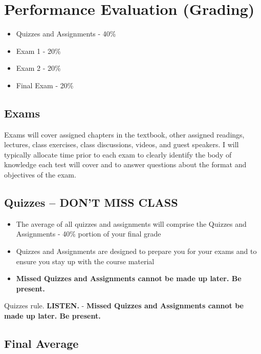\documentclass[
]{book}
\providecommand{\tightlist}{%
  \setlength{\itemsep}{0pt}\setlength{\parskip}{0pt}}
\begin{document}
\hypertarget{performance-evaluation-grading}{%
\section{Performance Evaluation (Grading)}\label{performance-evaluation-grading}}

\begin{itemize}
\tightlist
\item
  Quizzes and Assignments - 40\%
\item
  Exam 1 - 20\%
\item
  Exam 2 - 20\%
\item
  Final Exam - 20\%
\end{itemize}

\hypertarget{exams}{%
\subsection{Exams}\label{exams}}

Exams will cover assigned chapters in the textbook, other assigned readings, lectures, class exercises, class discussions, videos, and guest speakers. I will typically allocate time prior to each exam to clearly identify the body of knowledge each test will cover and to answer questions about the format and objectives of the exam.

\hypertarget{quizzes-dont-miss-class}{%
\subsection{\texorpdfstring{Quizzes -- \textbf{DON'T MISS CLASS}}{Quizzes -- DON'T MISS CLASS}}\label{quizzes-dont-miss-class}}

\begin{itemize}
\tightlist
\item
  The average of all quizzes and assignments will comprise the Quizzes and Assignments - 40\% portion of your final grade
\item
  Quizzes and Assignments are designed to prepare you for your exams and to ensure you stay up with the course material
\item
  \textbf{Missed Quizzes and Assignments cannot be made up later. Be present.}
\end{itemize}

Quizzes rule. \textbf{LISTEN.}
- \textbf{Missed Quizzes and Assignments cannot be made up later. Be present.}

\hypertarget{final-average}{%
\subsection{Final Average}\label{final-average}}
\end{document}
